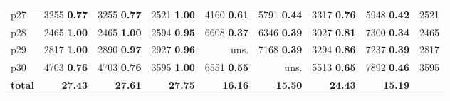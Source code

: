 \begin{tabular}{|l|rrrrrrr|r|}
p27 & {\footnotesize 3255} \textbf{0.77} & {\footnotesize 3255} \textbf{0.77} & {\footnotesize 2521} \textbf{1.00} & {\footnotesize 4160} \textbf{0.61} & {\footnotesize 5791} \textbf{0.44} & {\footnotesize 3317} \textbf{0.76} & {\footnotesize 5948} \textbf{0.42} & 2521\\
p28 & {\footnotesize 2465} \textbf{1.00} & {\footnotesize 2465} \textbf{1.00} & {\footnotesize 2594} \textbf{0.95} & {\footnotesize 6608} \textbf{0.37} & {\footnotesize 6346} \textbf{0.39} & {\footnotesize 3027} \textbf{0.81} & {\footnotesize 7300} \textbf{0.34} & 2465\\
p29 & {\footnotesize 2817} \textbf{1.00} & {\footnotesize 2890} \textbf{0.97} & {\footnotesize 2927} \textbf{0.96} & uns. & {\footnotesize 7168} \textbf{0.39} & {\footnotesize 3294} \textbf{0.86} & {\footnotesize 7237} \textbf{0.39} & 2817\\
p30 & {\footnotesize 4703} \textbf{0.76} & {\footnotesize 4703} \textbf{0.76} & {\footnotesize 3595} \textbf{1.00} & {\footnotesize 6551} \textbf{0.55} & uns. & {\footnotesize 5513} \textbf{0.65} & {\footnotesize 7892} \textbf{0.46} & 3595\\
\hline
\textbf{total} & \textbf{27.43} & \textbf{27.61} & \textbf{27.75} & \textbf{16.16} & \textbf{15.50} & \textbf{24.43} & \textbf{15.19} & \\
\hline
\end{tabular}

